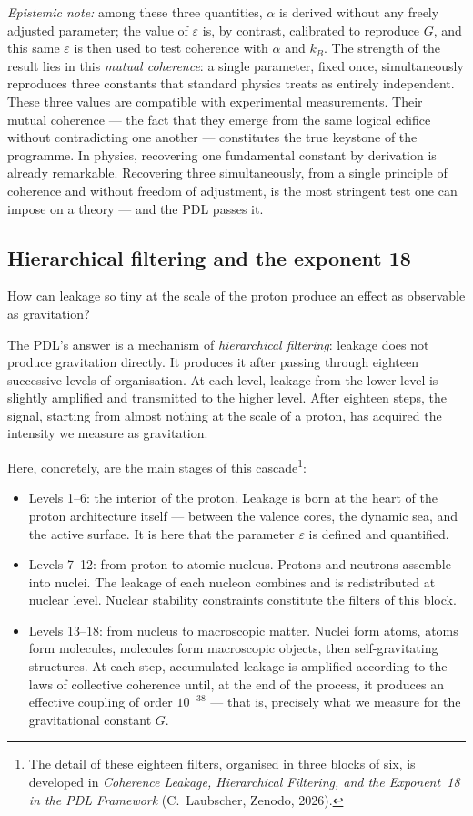 \documentclass[12pt, a4paper, openright]{book}
\begin{document}
{\textit{Epistemic note:} among these three quantities, $\alpha$ is derived without any freely adjusted parameter; the value of $\varepsilon$ is, by contrast, calibrated to reproduce $G$, and this same $\varepsilon$ is then used to test coherence with $\alpha$ and $k_B$. The strength of the result lies in this \emph{mutual coherence}: a single parameter, fixed once, simultaneously reproduces three constants that standard physics treats as entirely independent. These three values are compatible with experimental measurements. Their mutual coherence — the fact that they emerge from the same logical edifice without contradicting one another — constitutes the true keystone of the programme. In physics, recovering one fundamental constant by derivation is already remarkable. Recovering three simultaneously, from a single principle of coherence and without freedom of adjustment, is the most stringent test one can impose on a theory — and the PDL passes it.}

\subsection*{Hierarchical filtering and the exponent 18}

How can leakage so tiny at the scale of the proton produce an effect as observable as gravitation?

The PDL’s answer is a mechanism of \emph{hierarchical filtering}: leakage does not produce gravitation directly. It produces it after passing through eighteen successive levels of organisation. At each level, leakage from the lower level is slightly amplified and transmitted to the higher level. After eighteen steps, the signal, starting from almost nothing at the scale of a proton, has acquired the intensity we measure as gravitation.

Here, concretely, are the main stages of this cascade\footnote{%
  The detail of these eighteen filters, organised in three blocks of six, is developed in \emph{Coherence Leakage, Hierarchical Filtering, and the Exponent~18 in the PDL Framework} (C.~Laubscher, Zenodo, 2026).}:

\begin{itemize}
  \item Levels 1–6: the interior of the proton. Leakage is born at the heart of the proton architecture itself — between the valence cores, the dynamic sea, and the active surface. It is here that the parameter $\varepsilon$ is defined and quantified.
  \item Levels 7–12: from proton to atomic nucleus. Protons and neutrons assemble into nuclei. The leakage of each nucleon combines and is redistributed at nuclear level. Nuclear stability constraints constitute the filters of this block.
  \item Levels 13–18: from nucleus to macroscopic matter. Nuclei form atoms, atoms form molecules, molecules form macroscopic objects, then self-gravitating structures. At each step, accumulated leakage is amplified according to the laws of collective coherence until, at the end of the process, it produces an effective coupling of order $10^{-38}$ — that is, precisely what we measure for the gravitational constant $G$.
\end{itemize}
\end{document}
